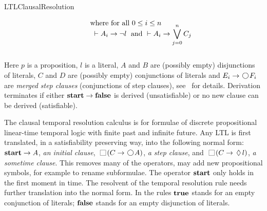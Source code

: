 \begin{entry}{LTLClausalResolution}
\begin{calculus}
\[\begin{array}{c}
\begin{array}[b]{ll}
& \quad
\begin{array}{l}
\text{where for all } 0 \leq i \leq n \\[-5pt]
\mbox{}\;\vdash A_i \rightarrow \neg l \; \text{ and }
\vdash A_i \rightarrow \displaystyle \bigvee_{j=0}^n C_j
\vspace*{0.9em}
\end{array}
\end{array}
\end{array}
\]

\vspace*{-1em}
Here $p$ is a proposition, $l$ is a literal, $A$ and $B$ are (possibly empty) disjunctions of literals,
$C$ and $D$ are (possibly empty) conjunctions of literals and $E_i\rightarrow\Next F_i$  are \emph{merged step clauses}
(conjunctions of step clauses), see~\cite{FDP01} for details.
Derivation terminates if either ${\bf start}\rightarrow{\bf false}$ is derived (unsatisfiable) or no new clause can be derived (satisfiable).  
\end{calculus}


 \begin{clarifications}
The clausal temporal resolution calculus is for formulae of discrete propositional
linear-time temporal logic with finite past and infinite future.
Any LTL is first translated, in a satisfiability preserving way, into the
following  normal form: 
${\bf start} \rightarrow A$, {\em an initial clause},
$ \Always (C \rightarrow  \Next A)$, {\em a step clause}, and
$\Always  (C   \rightarrow  \sometime l)$, {\em a sometime clause}.
%
This removes many of the operators, may add new propositional 
symbols, for example to rename subformulae.
%
The operator ${\bf start}$ only holds in the first moment in time. 
%
The resolvent of the temporal resolution rule needs further translation into
the normal form. 
%
In the rules ${\bf true}$ stands for an empty conjunction of literals; ${\bf false}$
stands for an empty disjunction of literals.
 \end{clarifications}


\end{entry}

